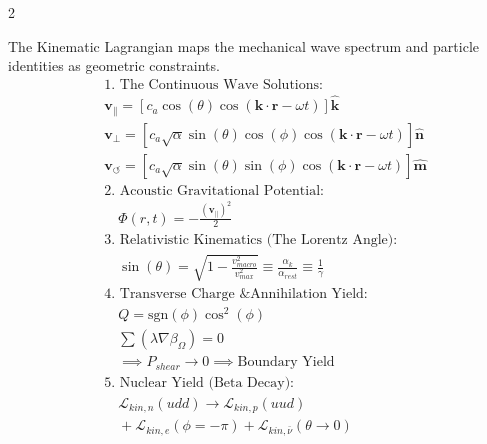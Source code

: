 \begin{multicols}{2}
\begin{tcolorbox}[cheatbox, title={\refstepcounter{cheatnum}\label{box:wave_mechanics}\thecheatnum. Continuous Wave Mechanics \scriptsize\hfill\hyperref[sec:deriv_wave_mechanics]{[Proof $\downarrow$]}}]
The Kinematic Lagrangian maps the mechanical wave spectrum and particle identities as geometric constraints.
\begin{align}
    &\text{1. The Continuous Wave Solutions:} \nonumber \\
    & \mathbf{v}_{\parallel} = \left[ c_a \cos(\theta) \cos(\mathbf{k} \cdot \mathbf{r} - \omega t) \right] \hat{\mathbf{k}} \label{eq:wave_p} \\
    & \mathbf{v}_{\perp} = \left[ c_a \sqrt{\alpha} \sin(\theta)\cos(\phi) \cos(\mathbf{k} \cdot \mathbf{r} - \omega t) \right] \hat{\mathbf{n}} \label{eq:wave_s} \\
    & \mathbf{v}_{\circlearrowleft} = \left[ c_a \sqrt{\alpha} \sin(\theta)\sin(\phi) \cos(\mathbf{k} \cdot \mathbf{r} - \omega t) \right] \hat{\mathbf{m}} \label{eq:wave_rot} \\
    &\text{2. Acoustic Gravitational Potential:} \nonumber \\
    &\quad \Phi(r,t) = - \frac{(\mathbf{v}_{\parallel})^2}{2} \label{eq:p_wave_potential} \\
    &\text{3. Relativistic Kinematics (The Lorentz Angle):} \nonumber \\
    &\quad \sin(\theta) = \sqrt{1 - \frac{v_{macro}^2}{v_{max}^2}} \equiv \frac{\alpha_k}{\alpha_{rest}} \equiv \frac{1}{\gamma} \label{eq:lorentz_angle} \\
    &\text{4. Transverse Charge \& Annihilation Yield:} \nonumber \\
    &\quad Q = \text{sgn}(\phi) \cos^2(\phi) \label{eq:charge_projection} \\
    &\quad \sum (\lambda \nabla \beta_\Omega) = 0 \nonumber \\ &\quad \implies P_{shear} \to 0 \implies \text{Boundary Yield} \label{eq:annihilation_limit} \\
    &\text{5. Nuclear Yield (Beta Decay):} \nonumber \\
    &\quad \mathcal{L}_{kin, n}(udd) \to \mathcal{L}_{kin, p}(uud) \nonumber \\ &\quad + \mathcal{L}_{kin, e}(\phi=-\pi) + \mathcal{L}_{kin, \bar{\nu}}(\theta \to 0) \label{eq:neutron_rupture}
\end{align}
\end{tcolorbox}






\end{multicols}
